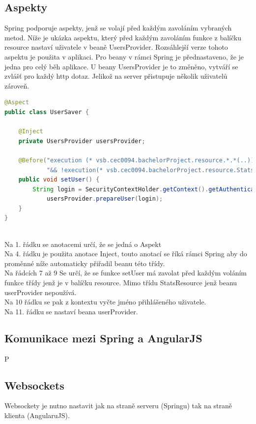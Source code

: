 \documentclass[czech,master,public,dept460,male,cpdeclaration,twoside]{diploma}
\begin{document}
\subsection{Aspekty}
Spring podporuje aspekty, jenž se volají před každým zavoláním vybraných metod. Níže je ukázka aspektu, který před každým zavoláním funkce z balíčku resource nastaví uživatele v beaně UsersProvider. Rozsáhlejší verze tohoto aspektu je použita v aplikaci. Pro beany v rámci Spring je přednastaveno, že je jedna pro celý běh aplikace. U beany UsersProvider je to změněno, vytváří se zvlášť pro každý http dotaz. Jelikož na server přistupuje několik uživatelů zároveň. \\

\begin{lstlisting}[language=Java,label=src:Java, caption=Ukázka aspektu]
@Aspect
public class UserSaver {

    @Inject
    private UsersProvider usersProvider;

    @Before("execution (* vsb.cec0094.bachelorProject.resource.*.*(..))" +
            "&& !execution(* vsb.cec0094.bachelorProject.resource.StatsResource.*(..))")
    public void setUser() {
        String login = SecurityContextHolder.getContext().getAuthentication().getName();
            usersProvider.prepareUser(login);
    }
}
\end{lstlisting}
~\\
Na 1. řádku se anotacemi určí, že se jedná o Aspekt\\
Na 4. řádku je použita anotace Inject, touto anotací se říká rámci Spring aby do proměnné níže automaticky přiřadil beanu této třídy.\\
Na řádcích 7 až 9 Se určí, že se funkce setUser má zavolat před každým voláním funkce třídy jenž je v balíčku resource. Mimo třídu StatsResource jenž beanu userProvider nepoužívá.\\
Na 10 řádku se pak z kontextu vyčte jméno přihlášeného uživatele.\\
Na 11. řádku se nastaví beana userProvider.

\subsection{Komunikace mezi Spring a AngularJS}
P

\subsection{Websockets}
Websockety je nutno nastavit jak na straně serveru (Springu) tak na straně klienta (AngularuJS).
\end{document}
